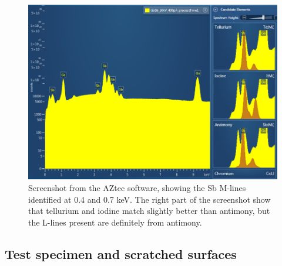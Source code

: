 \begin{figure}[htbp]
    \centering
    \includegraphics[width=0.99\linewidth]{figures/discussion/AZtec_Mlines.png}
    \caption{
        Screenshot from the AZtec software, showing the Sb M-lines identified at 0.4 and 0.7 keV.
        The right part of the screenshot show that tellurium and iodine match slightly better than antimony, but the L-lines present are definitely from antimony.
    }
    \label{fig:discussion:AZtec_Mlines}
\end{figure}





\subsection{Test specimen and scratched surfaces}
\label{discussion:test_specimen}



